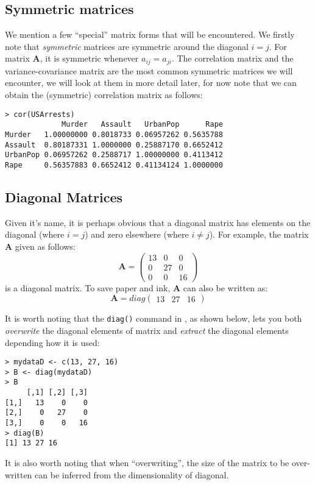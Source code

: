 \subsection{Symmetric matrices}

We mention a few ``special'' matrix forms that will be encountered.   We firstly note that \emph{symmetric} matrices are symmetric around the diagonal $i=j$.  For matrix $\boldsymbol{A}$, it is symmetric whenever $a_{ij} = a_{ji}$.    The correlation matrix and the variance-covariance matrix are the most common symmetric matrices we will encounter, we will look at them in more detail later, for now note that we can obtain the (symmetric) correlation matrix as follows:
\begin{verbatim}
> cor(USArrests)
             Murder   Assault   UrbanPop      Rape
Murder   1.00000000 0.8018733 0.06957262 0.5635788
Assault  0.80187331 1.0000000 0.25887170 0.6652412
UrbanPop 0.06957262 0.2588717 1.00000000 0.4113412
Rape     0.56357883 0.6652412 0.41134124 1.0000000
\end{verbatim}

\subsection{Diagonal Matrices}

Given it's name, it is perhaps obvious that a diagonal matrix has elements on the diagonal (where $i = j$) and zero elsewhere (where $i \neq j$).   For example, the matrix $\boldsymbol{A}$ given as follows:
\begin{displaymath}
\mathbf{A} = 
\left( \begin{array}{rrr}
13 & 0 & 0\\
0 & 27 &  0\\
0 & 0 & 16
\end{array}
\right)
\end{displaymath}
is a diagonal matrix.   To save paper and ink, $\boldsymbol{A}$ can also be written as:
\begin{displaymath}
\mathbf{A} = 
diag \left( \begin{array}{rrr}
13 & 27 & 16
\end{array}
\right)
\end{displaymath}

It is worth noting that the \verb+diag()+ command in \R, as shown below, lets you both \emph{overwrite} the diagonal elements of matrix and \emph{extract} the diagonal elements depending how it is used:
\singlespacing
\begin{verbatim}
> mydataD <- c(13, 27, 16)
> B <- diag(mydataD)
> B
     [,1] [,2] [,3]
[1,]   13    0    0
[2,]    0   27    0
[3,]    0    0   16
> diag(B)
[1] 13 27 16
\end{verbatim}
\onehalfspacing
It is also worth noting that when ``overwriting'', the size of the matrix to be over-written can be inferred from the dimensionality of diagonal.   

